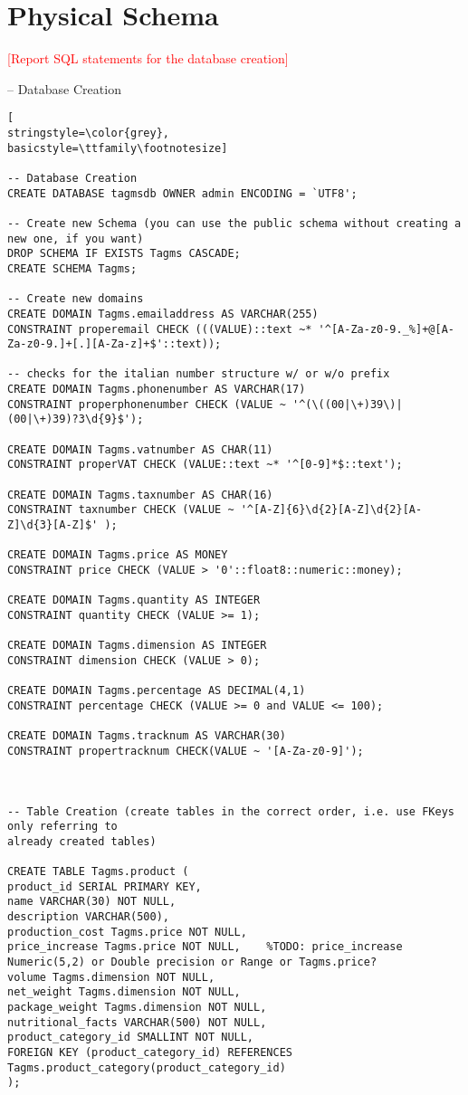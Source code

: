 \section{Physical Schema}
\textcolor{red}{[Report SQL statements for the database creation]}

-- Database Creation
\begin{lstlisting}[
stringstyle=\color{grey},
basicstyle=\ttfamily\footnotesize]

-- Database Creation
CREATE DATABASE tagmsdb OWNER admin ENCODING = `UTF8';

-- Create new Schema (you can use the public schema without creating a new one, if you want)
DROP SCHEMA IF EXISTS Tagms CASCADE;
CREATE SCHEMA Tagms;

-- Create new domains
CREATE DOMAIN Tagms.emailaddress AS VARCHAR(255)
CONSTRAINT properemail CHECK (((VALUE)::text ~* '^[A-Za-z0-9._%]+@[A-Za-z0-9.]+[.][A-Za-z]+$'::text));

-- checks for the italian number structure w/ or w/o prefix
CREATE DOMAIN Tagms.phonenumber AS VARCHAR(17)
CONSTRAINT properphonenumber CHECK (VALUE ~ '^(\((00|\+)39\)|(00|\+)39)?3\d{9}$');

CREATE DOMAIN Tagms.vatnumber AS CHAR(11)
CONSTRAINT properVAT CHECK (VALUE::text ~* '^[0-9]*$::text');

CREATE DOMAIN Tagms.taxnumber AS CHAR(16)
CONSTRAINT taxnumber CHECK (VALUE ~ '^[A-Z]{6}\d{2}[A-Z]\d{2}[A-Z]\d{3}[A-Z]$' );

CREATE DOMAIN Tagms.price AS MONEY
CONSTRAINT price CHECK (VALUE > '0'::float8::numeric::money);

CREATE DOMAIN Tagms.quantity AS INTEGER
CONSTRAINT quantity CHECK (VALUE >= 1);

CREATE DOMAIN Tagms.dimension AS INTEGER
CONSTRAINT dimension CHECK (VALUE > 0);

CREATE DOMAIN Tagms.percentage AS DECIMAL(4,1)
CONSTRAINT percentage CHECK (VALUE >= 0 and VALUE <= 100);

CREATE DOMAIN Tagms.tracknum AS VARCHAR(30)
CONSTRAINT propertracknum CHECK(VALUE ~ '[A-Za-z0-9]');



-- Table Creation (create tables in the correct order, i.e. use FKeys only referring to
already created tables)

CREATE TABLE Tagms.product (
product_id SERIAL PRIMARY KEY,
name VARCHAR(30) NOT NULL,
description VARCHAR(500),
production_cost Tagms.price NOT NULL,
price_increase Tagms.price NOT NULL,	%TODO: price_increase Numeric(5,2) or Double precision or Range or Tagms.price?
volume Tagms.dimension NOT NULL,
net_weight Tagms.dimension NOT NULL,
package_weight Tagms.dimension NOT NULL,
nutritional_facts VARCHAR(500) NOT NULL,
product_category_id SMALLINT NOT NULL,
FOREIGN KEY (product_category_id) REFERENCES Tagms.product_category(product_category_id)
);


\end{lstlisting}
